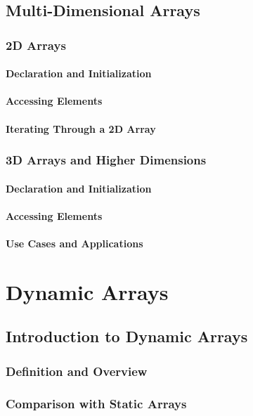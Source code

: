 \documentclass[12pt, oneside]{book}
\begin{document}
	\section{Multi-Dimensional Arrays}
	\subsection{2D Arrays}
	\subsubsection{Declaration and Initialization}
	\subsubsection{Accessing Elements}
	\subsubsection{Iterating Through a 2D Array}
	\subsection{3D Arrays and Higher Dimensions}
	\subsubsection{Declaration and Initialization}
	\subsubsection{Accessing Elements}
	\subsubsection{Use Cases and Applications}
\chapter{Dynamic Arrays}
	\section{Introduction to Dynamic Arrays}
	\subsection{Definition and Overview}
	\subsection{Comparison with Static Arrays}
	
\end{document}
